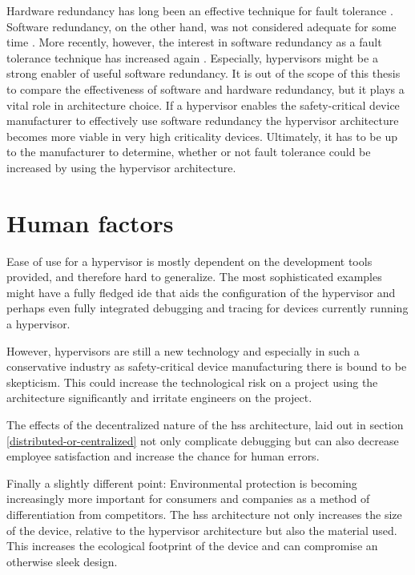 Hardware redundancy has long been an effective technique for fault tolerance \cite{rennels1984fault}.
Software redundancy, on the other hand, was not considered adequate for some time \cite{eckhardt1991experimental}. 
More recently, however, the interest in software redundancy as a fault tolerance technique has increased again \cite{de2016triple} \cite{carzaniga2009handling}.
Especially, hypervisors might be a strong enabler of useful software redundancy.
It is out of the scope of this thesis to compare the effectiveness of software and hardware redundancy, but it plays a vital role in architecture choice.
If a hypervisor enables the safety-critical device manufacturer to effectively use software redundancy the hypervisor architecture becomes more viable in very high criticality devices. Ultimately, it has to be up to the manufacturer to determine, whether or not fault tolerance could be increased by using the hypervisor architecture.


\section{Human factors}
Ease of use for a hypervisor is mostly dependent on the development tools provided, and therefore hard to generalize. The most sophisticated examples might have a fully fledged \acrshort{ide} that aids the configuration of the hypervisor and perhaps even fully integrated debugging and tracing for devices currently running a hypervisor. %

However, hypervisors are still a new technology and especially in such a conservative industry as safety-critical device manufacturing there is bound to be skepticism. This could increase the technological risk on a project using the architecture significantly and irritate engineers on the project.

The effects of the decentralized nature of the \acrshort{hss} architecture, laid out in section \ref{distributed-or-centralized} not only complicate debugging but can also decrease employee satisfaction and increase the chance for human errors.

Finally a slightly different point: Environmental protection is becoming increasingly more important for consumers and companies as a method of differentiation from competitors. The \acrshort{hss} architecture not only increases the size of the device, relative to the hypervisor architecture but also the material used. This increases the ecological footprint of the device and can compromise an otherwise sleek design.

